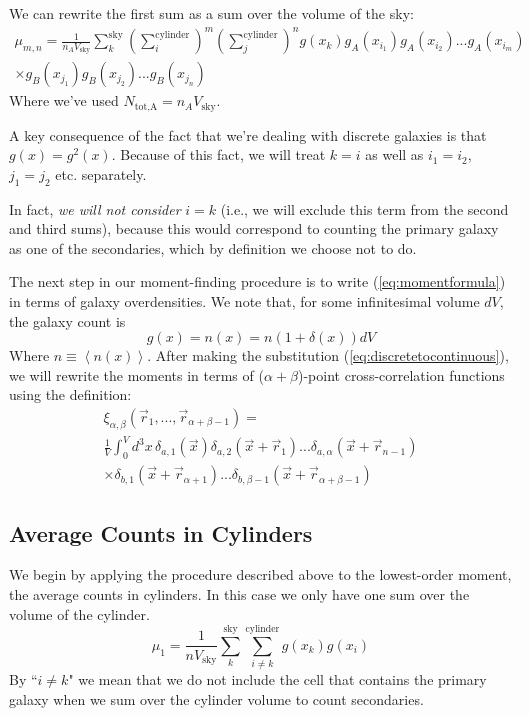 \documentclass[fleqn,usenatbib]{mnras}
\begin{document}
We can rewrite the first sum as a sum over the volume of the sky:
\begin{multline}
\label{eq:momentformula}
\mu_{m,n} = \frac{1}{n_AV_{\text{sky}}}\sum_k^{\text{sky}}\left(\sum_i^{\text{cylinder}}\right)^m\left(\sum_j^{\text{cylinder}}\right)^{n} g(x_k)  g_A(x_{i_1})g_A(x_{i_2})...g_A(x_{i_m}) \\ \times g_B(x_{j_1})g_B(x_{j_2})...g_B(x_{j_n})
\end{multline}
Where we've used $N_{\text{tot,A}} = n_AV_{\text{sky}}$.

A key consequence of the fact that we're dealing with discrete galaxies is that $g(x) = g^2(x)$. Because of this fact, we will treat $k = i$ as well as $i_1 = i_2$, $j_1 = j_2$ etc. separately.

In fact, \textit{we will not consider} $i = k$ (i.e., we will exclude this term from the second and third sums), because this would correspond to counting the primary galaxy as one of the secondaries, which by definition we choose not to do.

The next step in our moment-finding procedure is to write (\ref{eq:momentformula}) in terms of galaxy overdensities. We note that, for some infinitesimal volume $dV$, the galaxy count is 
\begin{equation}
\label{eq:discretetocontinuous}
g(x) = n(x) = n(1+\delta(x))dV 
\end{equation}
Where $n \equiv \left<n(x)\right>$.
After making the substitution (\ref{eq:discretetocontinuous}), we will rewrite the moments in terms of ($\alpha+\beta$)-point cross-correlation functions using the definition:
\begin{multline}
\label{eq:corrfuncdefinition}
\xi_{\alpha,\beta}(\vec{r}_1,...,\vec{r}_{\alpha+\beta-1}) = \\ \frac{1}{V}  \int_0^Vd^3x\,\delta_{a,1}(\vec{x})\delta_{a,2}(\vec{x}+\vec{r}_1)...\delta_{a,\alpha}(\vec{x}+\vec{r}_{n-1}) \\ \times \delta_{b,1}(\vec{x}+\vec{r}_{\alpha+1})...\delta_{b,\beta-1}(\vec{x}+\vec{r}_{\alpha+\beta-1})
\end{multline}

\subsection*{Average Counts in Cylinders}
We begin by applying the procedure described above to the lowest-order moment, the average counts in cylinders. In this case we only have one sum over the volume of the cylinder.
\begin{equation}
    \mu_1 = \frac{1}{nV_{\text{sky}}}\sum_k^{\text{sky}}\sum_{i\neq k}^{\text{cylinder}} g(x_k)g(x_i)
\end{equation}
By ``$i \neq k$" we mean that we do not include the cell that contains the primary galaxy when we sum over the cylinder volume to count secondaries.
\end{document}
